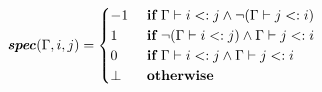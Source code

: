 \[\begin{array}{c}
    \textbf{\textit{spec}}(\Gamma, i, j) = \begin{cases}
        -1   & \ \textbf{if}\  \Gamma \vdash i <: j \wedge \neg(\Gamma \vdash j <: i) \\
        1    & \ \textbf{if}\  \neg(\Gamma \vdash i <: j) \wedge \Gamma \vdash j <: i \\
        0    & \ \textbf{if}\  \Gamma \vdash i <: j \wedge \Gamma \vdash j <: i \\
        \bot & \ \textbf{otherwise}
    \end{cases}
\end{array}\]

